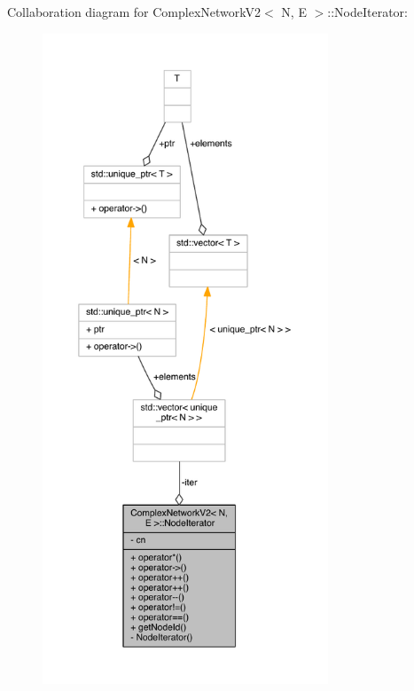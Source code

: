 Collaboration diagram for Complex\+Network\+V2$<$ N, E $>$\+:\+:Node\+Iterator\+:\nopagebreak
\begin{figure}[H]
\begin{center}
\leavevmode
\includegraphics[height=550pt]{class_complex_network_v2_1_1_node_iterator__coll__graph}
\end{center}
\end{figure}


